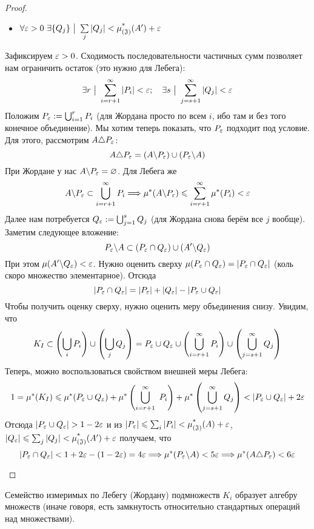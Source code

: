 \begin{proof}
\begin{itemize}
\begin{itemize}
			\item \(\forall \varepsilon > 0\ \exists \{Q_j\} \ \big|\  \sum\limits_j |Q_j| < \operatorname{\mu^*_{(\mathfrak{J})}}(A') + \varepsilon\)
		\end{itemize}
		Зафиксируем $\varepsilon > 0$. Сходимость последовательности частичных сумм позволяет нам ограничить остаток (это нужно для Лебега):
		\[
			\exists r \ \big|\  \sum\limits_{i = r + 1}^\infty |P_i| < \varepsilon; \quad \exists s \ \big|\  \sum\limits_{j = s + 1}^\infty |Q_j| < \varepsilon
		\]
		Положим $P_\varepsilon := \bigcup_{i = 1}^r P_i$ (для Жордана просто по всем $i$, ибо там и без того конечное объединение). Мы хотим теперь показать, что $P_\varepsilon$ подходит под условие. Для этого, рассмотрим $A \triangle P_\varepsilon$:
		\[
			A \triangle P_\varepsilon = (A \backslash P_\varepsilon) \cup (P_\varepsilon \backslash A)
		\]
		При Жордане у нас $A \backslash P_\varepsilon = \varnothing$. Для Лебега же
		\[
			A \backslash P_\varepsilon \subset \bigcup_{i = r + 1}^\infty P_i \Longrightarrow \mu^*(A \backslash P_\varepsilon) \leqslant \sum\limits_{i = r + 1}^\infty \mu^*(P_i) < \varepsilon
		\]
		Далее нам потребуется $Q_\varepsilon := \bigcup_{j = 1}^s Q_j$ (для Жордана снова берём все $j$ вообще). Заметим следующее вложение:
		\[
			P_\varepsilon \backslash A \subset (P_\varepsilon \cap Q_\varepsilon) \cup (A' \backslash Q_\varepsilon)
		\]
		При этом $\mu(A' \backslash Q_\varepsilon) < \varepsilon$. Нужно оценить сверху $\mu(P_\varepsilon \cap Q_\varepsilon) = |P_\varepsilon \cap Q_\varepsilon|$ (коль скоро множество элементарное). Отсюда
		\[
			|P_\varepsilon \cap Q_\varepsilon| = |P_\varepsilon| + |Q_\varepsilon| - |P_\varepsilon \cup Q_\varepsilon|
		\]
		Чтобы получить оценку сверху, нужно оценить меру объединения снизу. Увидим, что
		\[
			K_I \subset \left(\bigcup_i P_i\right) \cup \left(\bigcup_j Q_j\right) = P_\varepsilon \cup Q_\varepsilon \cup \left(\bigcup_{i = r + 1}^\infty P_i\right) \cup \left(\bigcup_{j = s + 1}^\infty Q_j\right)
		\]
		Теперь, можно воспользоваться свойством внешней меры Лебега:
		\[
			1 = \mu^*(K_I) \leqslant \mu^*(P_\varepsilon \cup Q_\varepsilon) + \mu^*\left(\bigcup_{i = r + 1}^\infty\ P_i\right) + \mu^*\left(\bigcup_{j = s + 1}^\infty Q_j\right) < |P_\varepsilon \cup Q_\varepsilon| + 2\varepsilon
		\]
		Отсюда $|P_\varepsilon \cup Q_\varepsilon| > 1 - 2\varepsilon$ и из $|P_\varepsilon| \leqslant \sum_i |P_i| < \operatorname{\mu^*_{(\mathfrak{J})}}(A) + \varepsilon$, $|Q_\varepsilon| \leqslant \sum_j |Q_j| < \operatorname{\mu^*_{(\mathfrak{J})}}(A') + \varepsilon$ получаем, что
		\[
			|P_\varepsilon \cap Q_\varepsilon| < 1 + 2\varepsilon - (1 - 2\varepsilon) = 4\varepsilon \Longrightarrow \mu^*(P_\varepsilon \backslash A) < 5\varepsilon \Longrightarrow \mu^*(A \triangle P_\varepsilon) < 6\varepsilon
		\]
	\end{itemize}
\end{proof}

\begin{theorem}
	Семейство измеримых по Лебегу (Жордану) подмножеств $K_i$ образует алгебру множеств (иначе говоря, есть замкнутость относительно стандартных операций над множествами).
\end{theorem}

